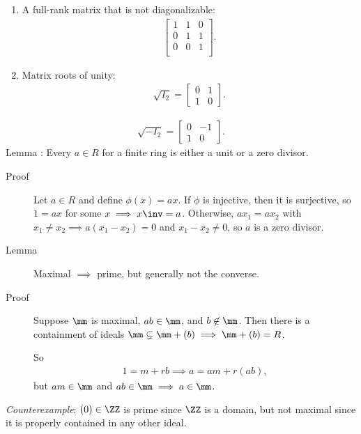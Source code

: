 \begin{enumerate}
\def\labelenumi{\arabic{enumi}.}
\setcounter{enumi}{3}
\item
  A full-rank matrix that is not diagonalizable: \begin{align*}
  \left[\begin{array}{ccc}
  1 & 1 & 0 \\
  0 & 1 & 1 \\
  0 & 0 & 1 \\
  \end{array}\right]
  .\end{align*}
\item
  Matrix roots of unity: \begin{align*} \sqrt{I_2} =
  \left[\begin{array}{cc}
  0 & 1\\
  1 & 0
  \end{array}\right]
  .\end{align*}
\end{enumerate}

\begin{align*} \sqrt{-I_2} =
\left[\begin{array}{cc}
0 & -1\\
1 & 0
\end{array}\right]
.\end{align*} Lemma : Every \(a\in R\) for a finite ring is either a
unit or a zero divisor.

\begin{description}
\item[Proof]
Let \(a\in R\) and define \(\phi(x) = ax\). If \(\phi\) is injective,
then it is surjective, so \(1 = ax\) for some \(x \implies x\inv = a\).
Otherwise, \(ax_1 = ax_2\) with
\(x_1 \neq x_2 \implies a(x_1 - x_2) = 0\) and \(x_1 - x_2 \neq 0\), so
\(a\) is a zero divisor.
\item[Lemma]
Maximal \(\implies\) prime, but generally not the converse.
\item[Proof]
Suppose \(\mm\) is maximal, \(ab\in \mm\), and \(b\not\in \mm\). Then
there is a containment of ideals
\(\mm \subsetneq \mm + (b) \implies \mm + (b) = R\).

So
\begin{align*}
1 = m + rb \implies a = am + r(ab)
,\end{align*} but \(am\in \mm\) and \(ab\in \mm \implies a\in \mm\).
\end{description}

\emph{Counterexample}: \((0) \in \ZZ\) is prime since \(\ZZ\) is a
domain, but not maximal since it is properly contained in any other
ideal.


